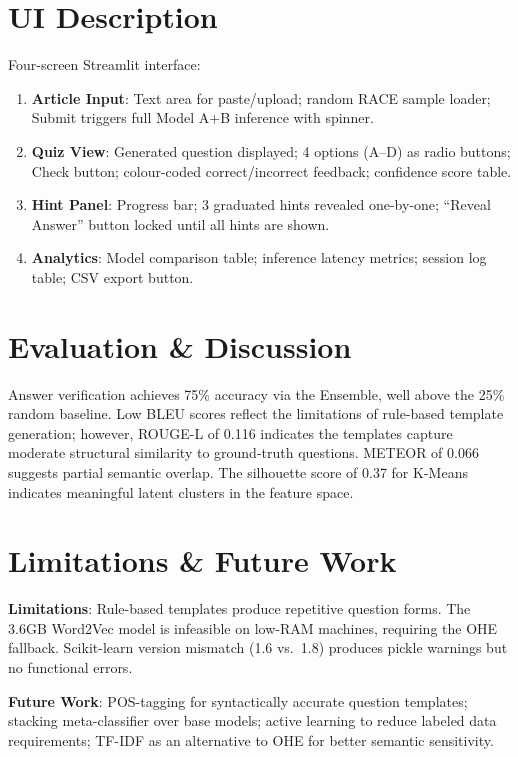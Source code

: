 \documentclass[10pt,twocolumn]{article}
\begin{document}
\section{UI Description}
Four-screen Streamlit interface:
\begin{enumerate}
    \item \textbf{Article Input}: Text area for paste/upload; random RACE sample loader; Submit triggers full Model A+B inference with spinner.
    \item \textbf{Quiz View}: Generated question displayed; 4 options (A--D) as radio buttons; Check button; colour-coded correct/incorrect feedback; confidence score table.
    \item \textbf{Hint Panel}: Progress bar; 3 graduated hints revealed one-by-one; ``Reveal Answer'' button locked until all hints are shown.
    \item \textbf{Analytics}: Model comparison table; inference latency metrics; session log table; CSV export button.
\end{enumerate}

\section{Evaluation \& Discussion}
Answer verification achieves 75\% accuracy via the Ensemble, well above the 25\% random baseline. Low BLEU scores reflect the limitations of rule-based template generation; however, ROUGE-L of 0.116 indicates the templates capture moderate structural similarity to ground-truth questions. METEOR of 0.066 suggests partial semantic overlap. The silhouette score of 0.37 for K-Means indicates meaningful latent clusters in the feature space.

\section{Limitations \& Future Work}
\textbf{Limitations}: Rule-based templates produce repetitive question forms. The 3.6GB Word2Vec model is infeasible on low-RAM machines, requiring the OHE fallback. Scikit-learn version mismatch (1.6 vs.\ 1.8) produces pickle warnings but no functional errors.

\textbf{Future Work}: POS-tagging for syntactically accurate question templates; stacking meta-classifier over base models; active learning to reduce labeled data requirements; TF-IDF as an alternative to OHE for better semantic sensitivity.
\end{document}
